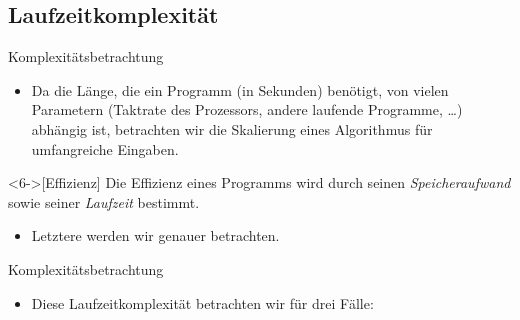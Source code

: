 \subsection{Laufzeitkomplexität}
\begin{frame}{Komplexitätsbetrachtung}
    \begin{itemize}[<+(1)->]
        \widei
        \item Da die Länge, die ein Programm (in Sekunden) benötigt,\pause{} von vielen Parametern\pause{} (Taktrate des Prozessors, andere laufende Programme, \ldots) abhängig ist,\pause{} betrachten wir die Skalierung eines Algorithmus für umfangreiche Eingaben.
    \end{itemize}
    \begin{definition}<6->[Effizienz]
        \pause{}Die Effizienz eines Programms wird durch seinen \emph{Speicheraufwand} sowie seiner \emph{Laufzeit} bestimmt.
    \end{definition}
    \begin{itemize}[<+(1)->]
        \widei
        \item<8-> Letztere werden wir genauer betrachten. 
    \end{itemize}
\end{frame}

\begin{frame}{Komplexitätsbetrachtung}
    \begin{itemize}[<+(1)->]
        \widei
        \item Diese Laufzeitkomplexität betrachten wir für drei Fälle: 
    \end{itemize}
\end{frame}

